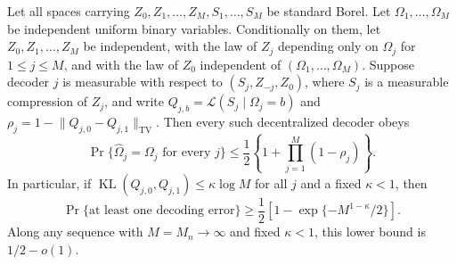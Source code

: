 Let all spaces carrying \(Z_0,Z_1,\ldots,Z_M,S_1,\ldots,S_M\) be standard Borel.  Let \(\Omega_1,\ldots,\Omega_M\) be independent uniform binary variables.  Conditionally on them, let \(Z_0,Z_1,\ldots,Z_M\) be independent, with the law of \(Z_j\) depending only on \(\Omega_j\) for \(1\leq j\leq M\), and with the law of \(Z_0\) independent of \((\Omega_1,\ldots,\Omega_M)\).  Suppose decoder \(j\) is measurable with respect to \((S_j,Z_{-j},Z_0)\), where \(S_j\) is a measurable compression of \(Z_j\), and write \(Q_{j,b}=\mathcal L(S_j\mid\Omega_j=b)\) and \(\rho_j=1-\lVert Q_{j,0}-Q_{j,1}\rVert_{\mathrm{TV}}\).  Then every such decentralized decoder obeys
\[
 \Pr\{\widehat\Omega_j=\Omega_j\text{ for every }j\}
 \leq\frac12\left\{1+\prod_{j=1}^M(1-\rho_j)\right\}.
\]
In particular, if \(\operatorname{KL}(Q_{j,0},Q_{j,1})\leq\kappa\log M\) for all \(j\) and a fixed \(\kappa<1\), then
\[
 \Pr\{\text{at least one decoding error}\}
 \geq\frac12\left[1-\exp\{-M^{1-\kappa}/2\}\right].
\]
Along any sequence with \(M=M_n\to\infty\) and fixed \(\kappa<1\), this lower bound is \(1/2-o(1)\).